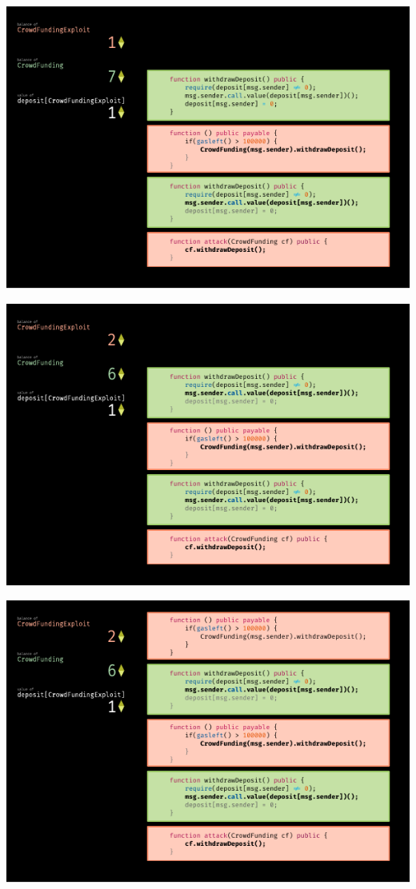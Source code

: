 \documentclass[xcolor=x11names,compress]{beamer}
\begin{document}
\begin{frame}[fragile]
\begin{overprint}
\begin{center}
		\end{center}
		\begin{center}
			\includegraphics[width=\textwidth,height=0.8\textheight,keepaspectratio]{img/reentrancy/06.pdf}
		\end{center}
		\begin{center}
			\includegraphics[width=\textwidth,height=0.8\textheight,keepaspectratio]{img/reentrancy/07.pdf}
		\end{center}
		\begin{center}
			\includegraphics[width=\textwidth,height=0.8\textheight,keepaspectratio]{img/reentrancy/08.pdf}

\end{center}
\end{overprint}
\end{frame}
\end{document}
